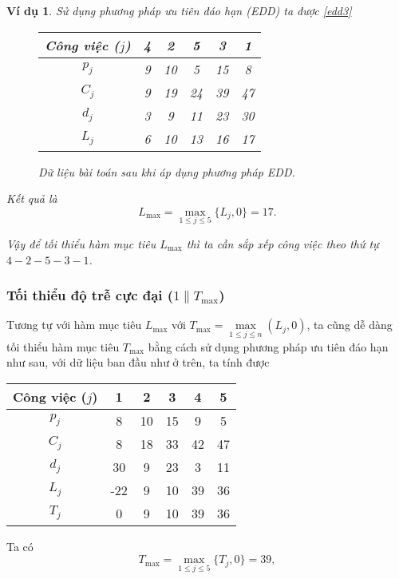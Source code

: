 \documentclass[12pt,a4paper]{report}
\newtheorem{vd}{Ví dụ}
\begin{document}
\begin{vd}
Sử dụng phương pháp ưu tiên đáo hạn (EDD) ta được \eqref{edd3}

\begin{figure}[h!]
\centering
	\begin{tabular}{|c | c c c c c |} 
	\hline
	Công việc ($j$) & 4 & 2 & 5 & 3 & 1 \\
	\hline\hline
	$p_j$ & 9 & 10 & 5 & 15 & 8 \\
	$C_j$ & 9 & 19 & 24 & 39 & 47 \\
	$d_j$ & 3 & 9 & 11 & 23 & 30 \\
	$L_j$ & 6 & 10 & 13 & 16 & 17 \\
	\hline
	\end{tabular}
	\caption{\label{edd3} Dữ liệu bài toán sau khi áp dụng phương pháp EDD.}
\end{figure}

Kết quả là
\begin{equation*}
	L_{\max} = \max _{1 \leq j \leq 5} \{L_j, 0\} = 17.
\end{equation*}

Vậy để tối thiểu hàm mục tiêu $L_{\max}$ thì ta cần sắp xếp công việc theo thứ tự $4-2-5-3-1$.
\end{vd}

\subsubsection*{Tối thiểu độ trễ cực đại ($1 \| T_{\max}$)}
Tương tự với hàm mục tiêu $L_{\max}$ với $T_{\max}=\underset{1 \leq j \leq n}{\max} (L_j,0)$, ta cũng dễ dàng tối thiểu hàm mục tiêu $T_{\max}$ bằng cách sử dụng phương pháp ưu tiên đáo hạn như sau, với dữ liệu ban đầu như ở trên, ta tính được

\begin{table}[h!]
	\centering
	\begin{tabular}{|c | c c c c c |} 
	\hline
	Công việc ($j$) & 1 & 2 & 3 & 4 & 5 \\
	\hline\hline
	$p_j$ & 8 & 10 & 15 & 9 & 5 \\
	$C_j$ & 8 & 18 & 33 & 42 & 47 \\
	$d_j$ & 30 & 9 & 23 & 3 & 11 \\
	$L_j$ & -22 & 9 & 10 & 39 & 36 \\
	$T_j$ & 0 & 9 & 10 & 39 & 36 \\
	\hline
	\end{tabular}
\end{table}
Ta có
\begin{equation*}
	T_{\max} = \max _{1 \leq j \leq 5} \{T_j, 0\} = 39,
\end{equation*}
\end{document}
